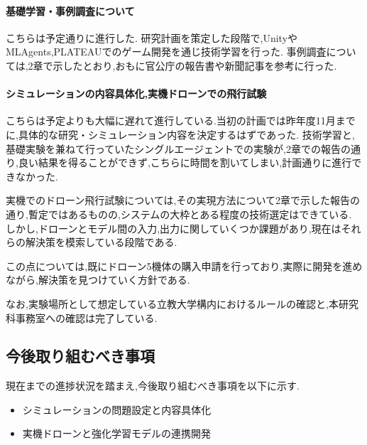 \documentclass{article}[jsarticle]
\begin{document}
\paragraph{基礎学習・事例調査について}こちらは予定通りに進行した.
研究計画を策定した段階で,UnityやMLAgents,PLATEAUでのゲーム開発を通じ技術学習を行った.
事例調査については,2章で示したとおり,おもに官公庁の報告書や新聞記事を参考に行った.\par 
\paragraph{シミュレーションの内容具体化,実機ドローンでの飛行試験}
こちらは予定よりも大幅に遅れて進行している.当初の計画では昨年度11月までに,具体的な研究・シミュレーション内容を決定するはずであった.
技術学習と,基礎実験を兼ねて行っていたシングルエージェントでの実験が,2章での報告の通り,良い結果を得ることができず,こちらに時間を割いてしまい,計画通りに進行できなかった.\par 
実機でのドローン飛行試験については,その実現方法について2章で示した報告の通り,暫定ではあるものの,システムの大枠とある程度の技術選定はできている.
しかし,ドローンとモデル間の入力,出力に関していくつか課題があり,現在はそれらの解決策を模索している段階である.\par 
この点については,既にドローン5機体の購入申請を行っており,実際に開発を進めながら,解決策を見つけていく方針である.\par 
なお,実験場所として想定している立教大学構内におけるルールの確認と,本研究科事務室への確認は完了している.\par

\subsection{今後取り組むべき事項}
現在までの進捗状況を踏まえ,今後取り組むべき事項を以下に示す.
\begin{itemize}
    \item シミュレーションの問題設定と内容具体化
    \item 実機ドローンと強化学習モデルの連携開発
\end{itemize}
\end{document}
